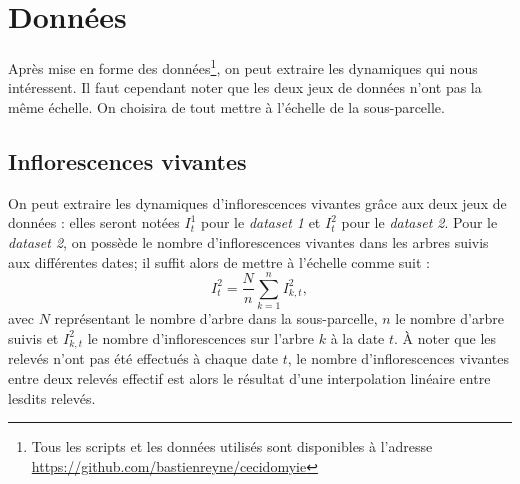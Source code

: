 \section{Données}

Après mise en forme des données\footnote{Tous les scripts et les données utilisés sont disponibles à l'adresse \url{https://github.com/bastienreyne/cecidomyie}}, on peut extraire les dynamiques qui nous intéressent.
Il faut cependant noter que les deux jeux de données n'ont pas la même échelle.
On choisira de tout mettre à l'échelle de la sous-parcelle.

\subsection{Inflorescences vivantes}

On peut extraire les dynamiques d'inflorescences vivantes grâce aux deux jeux de données : elles seront notées $I^1_t$ pour le \emph{dataset 1} et $I^2_t$ pour le \emph{dataset 2}.
Pour le \emph{dataset 2}, on possède le nombre d'inflorescences vivantes dans les arbres suivis aux différentes dates; il suffit alors de mettre à l'échelle comme suit :
\[
I_{t}^{2} = \frac{N}{n}\sum_{k=1}^{n} I^{2}_{k, t},
\]
avec $N$ représentant le nombre d'arbre dans la sous-parcelle, $n$ le nombre d'arbre suivis et $I^{2}_{k, t}$ le nombre d'inflorescences sur l'arbre $k$ à la date $t$.
À noter que les relevés n'ont pas été effectués à chaque date $t$, le nombre d'inflorescences vivantes entre deux relevés effectif est alors le résultat d'une interpolation linéaire entre lesdits relevés.

